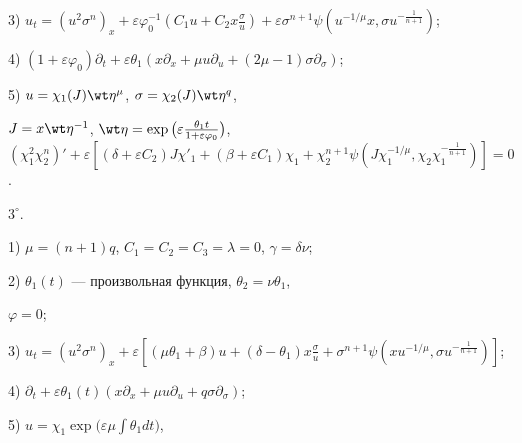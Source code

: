  


3) $u_t=(u^2\sigma^n)_x+\varepsilon\varphi^{-1}_0(C_1u+C_2x 


\frac{\sigma}{u})+\varepsilon\sigma^{n+1}\psi(u^{-1/\mu}x, \sigma 


u^{-\frac{1}{n+1}})$; 


 


4) $(1+\varepsilon\varphi_0)\partial_t+\varepsilon\theta_1(x 


\partial_x+\mu u\partial_u+(2\mu-1)\sigma\partial_\sigma)$; 


 


5) $u=\chi_1(J)\wt\eta^\mu$, $\sigma=\chi_2(J)\wt\eta^q$, 


$J=x\wt\eta{}^{-1}$, $\wt\eta=\exp\big(\varepsilon 


\frac{\theta_1t}{1+\varepsilon\varphi_0}\big)$, $(\chi^2_1\chi^n_2)'+ 


\varepsilon[(\delta+\varepsilon C_2)J \chi'_1+ 


(\beta+\varepsilon C_1)\chi_1+ \chi^{n+1}_2\psi 


(J\chi^{-1/\mu}_1, \chi_2\chi^{-\frac{1}{n+1}}_1)]=0$. 


 


\noindent{}$3^\circ$. 


 


1) $\mu=(n+1)q$, $C_1=C_2=C_3=\lambda=0$, $\gamma=\delta\nu$; 


 


2) $\theta_1(t)$ --- произвольная функция, $\theta_2=\nu\theta_1$, 


$\varphi=0$; 


 


3) $u_t=(u^2\sigma^n)_x+\varepsilon[(\mu\theta_1+\beta)u+ 


(\delta-\theta_1)x\frac{\sigma}{u}+\sigma^{n+1}\psi(x u^{-1/\mu}, 


\sigma u^{-\frac{1}{n+1}})]$; 


 


4) $\partial_t+\varepsilon\theta_1(t)(x\partial_x+\mu u\partial_u 


+q\sigma\partial_\sigma)$; 


 


5) $u=\chi_1\exp\big(\varepsilon\mu\int\theta_1dt\big)$, 


